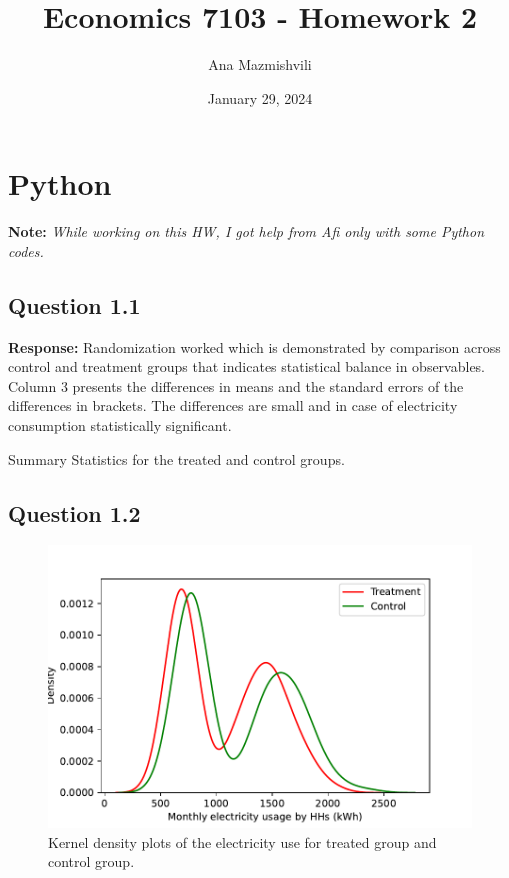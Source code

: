 \documentclass{article}
\title{Economics 7103 - Homework 2}
\author{Ana Mazmishvili}
\date{ January 29, 2024 }
\begin{document}
  
\maketitle 

\section*{Python}
\textbf{Note:} \textit{ While working on this HW, I got help from Afi only with some Python codes.}

\subsection*{Question 1.1}
\textbf{Response:} Randomization worked which is demonstrated by comparison across control and treatment groups that indicates statistical balance in observables. Column 3 presents the differences in means and the standard errors of the differences in brackets. The differences are small and in case of electricity consumption statistically significant.

\begin{table}[hbt!]
    \centering
    
    \caption{Summary Statistics for the treated and control groups.}
    \label{tab:my_label}
\end{table}


\subsection*{Question 1.2}

\begin{figure}[hbt!]
    \centering
    \includegraphics[scale = 0.7]{homework 2/output/figure/densityplotpy.pdf}
    \caption{Kernel density plots of the electricity use for treated group and control group.}
    \label{fig:hist}
\end{figure}
\end{document}
